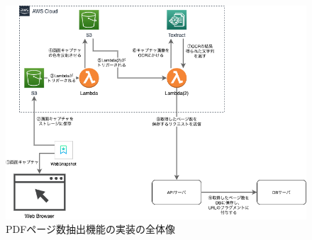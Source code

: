 \begin{figure}[htbp]
  \label{fig:impl-pdf-overall}
  \begin{center}
    \includegraphics[bb=0 0 734 522,width=15cm]{img/050_implementation/server/impl-pdf-overall.pdf}
  \end{center}
  \caption{PDFページ数抽出機能の実装の全体像}
\end{figure}
